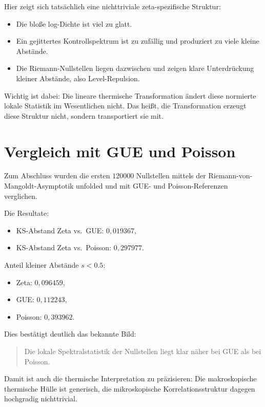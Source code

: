 \documentclass[11pt,a4paper]{article}
\theoremstyle{definition}
\theoremstyle{remark}
\begin{document}
	Hier zeigt sich tatsächlich eine nichttriviale zeta-spezifische Struktur:
	\begin{itemize}[leftmargin=1.5em]
		\item Die bloße log-Dichte ist viel zu glatt.
		\item Ein gejittertes Kontrollspektrum ist zu zufällig und produziert zu viele kleine Abstände.
		\item Die Riemann-Nullstellen liegen dazwischen und zeigen klare Unterdrückung kleiner Abstände, also Level-Repulsion.
	\end{itemize}
	
	Wichtig ist dabei: Die lineare thermische Transformation ändert diese normierte lokale Statistik im Wesentlichen nicht. Das heißt, die Transformation erzeugt diese Struktur nicht, sondern transportiert sie mit.
	
	\section{Vergleich mit GUE und Poisson}
	
	Zum Abschluss wurden die ersten $120000$ Nullstellen mittels der Riemann-von-Mangoldt-Asymptotik unfolded und mit GUE- und Poisson-Referenzen verglichen.
	
	Die Resultate:
	\begin{itemize}[leftmargin=1.5em]
		\item KS-Abstand Zeta vs.\ GUE: $0{,}019367$,
		\item KS-Abstand Zeta vs.\ Poisson: $0{,}297977$.
	\end{itemize}
	
	Anteil kleiner Abstände $s<0.5$:
	\begin{itemize}[leftmargin=1.5em]
		\item Zeta: $0{,}096459$,
		\item GUE: $0{,}112243$,
		\item Poisson: $0{,}393962$.
	\end{itemize}
	
	Dies bestätigt deutlich das bekannte Bild:
	\begin{quote}
		Die lokale Spektralstatistik der Nullstellen liegt klar näher bei GUE als bei Poisson.
	\end{quote}
	
	Damit ist auch die thermische Interpretation zu präzisieren: Die makroskopische thermische Hülle ist generisch, die mikroskopische Korrelationsstruktur dagegen hochgradig nichttrivial.
	
\end{document}
